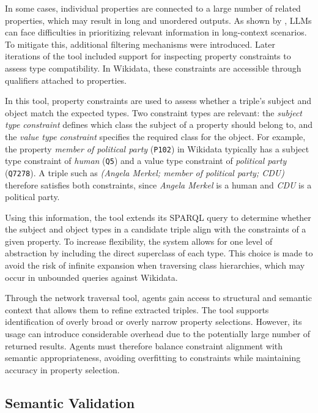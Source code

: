 \documentclass[a4paper,oneside,bibliography=totoc]{scrbook}
\begin{document}
In some cases, individual properties are connected to a large number of related properties, which may result in long and unordered outputs. As shown by \citet{Hsieh2024}, \acp{LLM} can face difficulties in prioritizing relevant information in long-context scenarios. To mitigate this, additional filtering mechanisms were introduced. Later iterations of the tool included support for inspecting property constraints to assess type compatibility. In Wikidata, these constraints are accessible through qualifiers attached to properties.

In this tool, property constraints are used to assess whether a triple’s subject and object match the expected types. Two constraint types are relevant: the \textit{subject type constraint} defines which class the subject of a property should belong to, and the \textit{value type constraint} specifies the required class for the object. For example, the property \textit{member of political party} (\texttt{P102}) in Wikidata typically has a subject type constraint of \textit{human} (\texttt{Q5}) and a value type constraint of \textit{political party} (\texttt{Q7278}). A triple such as \textit{(Angela Merkel; member of political party; CDU)} therefore satisfies both constraints, since \textit{Angela Merkel} is a human and \textit{CDU} is a political party.

Using this information, the tool extends its \ac{SPARQL} query to determine whether the subject and object types in a candidate triple align with the constraints of a given property. To increase flexibility, the system allows for one level of abstraction by including the direct superclass of each type. This choice is made to avoid the risk of infinite expansion when traversing class hierarchies, which may occur in unbounded queries against Wikidata.

Through the network traversal tool, agents gain access to structural and semantic context that allows them to refine extracted triples. The tool supports identification of overly broad or overly narrow property selections. However, its usage can introduce considerable overhead due to the potentially large number of returned results. Agents must therefore balance constraint alignment with semantic appropriateness, avoiding overfitting to constraints while maintaining accuracy in property selection.

\subsection{Semantic Validation}
\label{subsec:semantic_validation}
\end{document}
